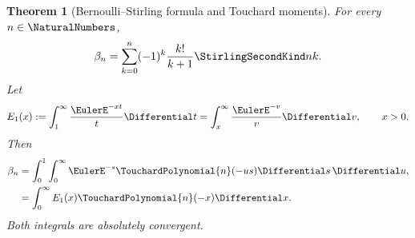 \documentclass[11pt,a4paper,oneside,openany]{book}
\newtheorem{theorem}{Theorem}[chapter]
\theoremstyle{definition}
\theoremstyle{remark}
\begin{document}
\begin{theorem}[Bernoulli--Stirling formula and Touchard moments]
\label{thm:merged-bernoulli-stirling-touchard}
For every $n\in\NaturalNumbers$,
\begin{equation}
 \beta_n=\sum_{k=0}^{n}(-1)^k\frac{k!}{k+1}\StirlingSecondKind nk .
 \label{eq:merged-bernoulli-stirling}
\end{equation}
Let
\begin{equation}
 E_1(x):=\int_1^\infty \frac{\EulerE^{-xt}}{t}\Differential t
        =\int_x^\infty\frac{\EulerE^{-v}}{v}\Differential v,
 \qquad x>0.                                                       \label{eq:merged-exponential-integral-one}
\end{equation}
Then
\begin{align}
 \beta_n
 &=\int_0^1\int_0^\infty
     \EulerE^{-s}\TouchardPolynomial{n}(-us)
     \Differential s\,\Differential u,                            \label{eq:merged-bernoulli-touchard-double-integral}\\
 &=\int_0^\infty E_1(x)\TouchardPolynomial{n}(-x)\Differential x. \label{eq:merged-bernoulli-touchard-integral}
\end{align}
Both integrals are absolutely convergent.
\end{theorem}
\end{document}
